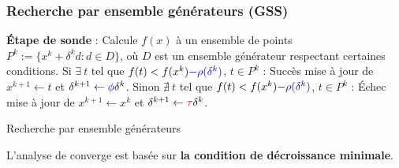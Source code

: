 \documentclass{beamer}
\newcommand\tab[1][1cm]{\hspace*{#1}}
\newcommand{\GSS}{\textsf{GSS}}
\begin{document}
\begin{frame}
\frametitle{Recherche par ensemble générateurs (\GSS)}
\begin{algorithm}[H]
\begin{algorithmic}[]
\STATE \textbf{Étape de sonde} : Calcule $f(x)$ à un ensemble de points 
\STATE $P^k:=\{x^k+\delta ^k d:d\in D\}$, où {\color{blue}$D$ est un ensemble générateur 
\STATE respectant certaines conditions}.
\STATE
\STATE Si $\exists~t$ tel que $f(t) < f(x^k){\color{blue}-\rho(\delta^k)}$, $t\in P^k$ : Succès
\STATE \tab mise à jour de $x^{k+1}\leftarrow t$ et $\delta^{k+1} \leftarrow {\color{blue}\phi}\delta^k$.
\STATE
\STATE Sinon $\nexists~t$ tel que $f(t) < f(x^k){\color{blue}-\rho(\delta^k)}$, $t\in P^k$ : Échec
\STATE \tab mise à jour de $x^{k+1}\leftarrow x^k$ et $\delta^{k+1} \leftarrow {\color{red}\tau}\delta^k$.
\ENDFOR
\end{algorithmic}
\caption{Recherche par ensemble générateurs}
\label{alg:gps}
\end{algorithm}
L'analyse de converge est basée sur \textbf{la condition de décroissance minimale}.
\end{frame}
\end{document}
